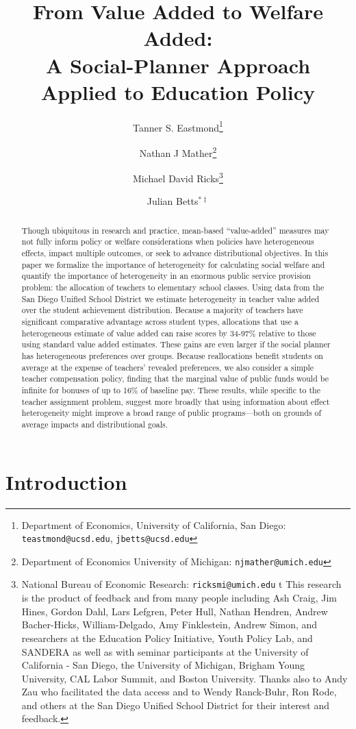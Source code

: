 \documentclass[12pt]{article}
\title{From Value Added to Welfare Added: \\ A Social-Planner Approach Applied to Education Policy}
\author{Tanner S. Eastmond\thanks{Department of Economics, University of California, San Diego: \texttt{teastmond@ucsd.edu}, \texttt{jbetts@ucsd.edu}} \and Nathan J Mather\thanks{Department of Economics University of Michigan: \texttt{njmather@umich.edu}} \and Michael David Ricks\thanks{National Bureau of Economic Research: \texttt{ricksmi@umich.edu} \hspace{17em} {\color{white}t} This research is the product of feedback and from many people including Ash Craig, Jim Hines, Gordon Dahl, Lars Lefgren, Peter Hull, Nathan Hendren, Andrew Bacher-Hicks, William-Delgado, Amy Finklestein, %
Andrew Simon, and  researchers at the Education Policy Initiative, Youth Policy Lab, and SANDERA as well as with seminar participants at the University of California - San Diego, the University of Michigan, Brigham Young University, CAL Labor Summit, and Boston University. Thanks also to Andy Zau who facilitated the data access and to  Wendy Ranck-Buhr, Ron Rode, and others at the San Diego Unified School District for their interest and feedback.} \and Julian Betts$^{*\ddagger}$}
\theoremstyle{definition}
\theoremstyle{definition}
\theoremstyle{definition}
\theoremstyle{definition}
\begin{document}
\maketitle



\begin{abstract}

Though ubiquitous in research and practice, mean-based “value-added” measures may not fully inform policy or welfare considerations when policies have heterogeneous effects, impact multiple outcomes, or seek to advance distributional objectives. In this paper we formalize the importance of heterogeneity for calculating social welfare and quantify the importance of heterogeneity in an enormous public service provision problem: the allocation of teachers to elementary school classes. Using data from the San Diego Unified School District we estimate heterogeneity in teacher value added over the student achievement distribution. Because a majority of teachers have significant comparative advantage across student types, allocations that use a heterogeneous estimate of value added can raise scores by 34-97\% relative to those using standard value added estimates. These gains are even larger if the social planner has heterogeneous preferences over groups. Because reallocations benefit students on average at the expense of teachers' revealed preferences, we also consider a simple teacher compensation policy, finding that the marginal value of public funds would be infinite for bonuses of up to 16\% of baseline pay. These results, while specific to the teacher assignment problem, suggest more broadly that using information about effect heterogeneity might improve a broad range of public programs—both on grounds of average impacts and distributional goals.

\end{abstract}

\onehalfspacing

\pagebreak 

\section{Introduction}

\end{document}
